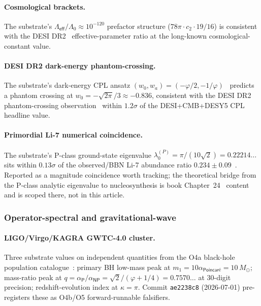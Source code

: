 \documentclass[11pt,a4paper]{amsart}
\theoremstyle{plain}
\theoremstyle{definition}
\begin{document}
\paragraph{Cosmological brackets.} The substrate's $\Lambda_{\textsf{eff}}/\Lambda_0 \approx 10^{-120}$ prefactor structure ($78\pi \cdot c_2 \cdot 19/16$) is consistent with the DESI DR2~\cite{desi-dr2-w0wa} effective-parameter ratio at the long-known cosmological-constant value.

\paragraph{DESI DR2 dark-energy phantom-crossing.} The substrate's dark-energy CPL ansatz $(w_0, w_a) = (-\varphi/2, -1/\varphi)$~\cite{cohen2026book} predicts a phantom crossing at $w_0 = -\sqrt{2\pi}/3 \approx -0.836$, consistent with the DESI DR2 phantom-crossing observation~\cite{desi-dr2-w0wa} within $1.2\sigma$ of the DESI+CMB+DESY5 CPL headline value.

\paragraph{Primordial Li-7 numerical coincidence.} The substrate's P-class ground-state eigenvalue $\lambda_0^{(P)} = \pi/(10\sqrt{2}) = 0.22214\ldots$ sits within $0.13\sigma$ of the observed/BBN Li-7 abundance ratio $0.234 \pm 0.09$~\cite{li7-deficit-2025}. Reported as a magnitude coincidence worth tracking; the theoretical bridge from the P-class analytic eigenvalue to nucleosynthesis is book Chapter~24~\cite{cohen2026book} content and is scoped there, not in this article.

\subsubsection*{Operator-spectral and gravitational-wave}

\paragraph{LIGO/Virgo/KAGRA GWTC-4.0 cluster.} Three substrate values on independent quantities from the O4a black-hole population catalogue~\cite{ligo-gwtc4-cat,ligo-gwtc4-pop}: primary BH low-mass peak at $m_1 = 10 \alpha_{\textsf{Poincar\'e}} = 10\, M_\odot$; mass-ratio peak at $q = \alpha_{\textsf{P}}/\alpha_{\textsf{NP}} = \sqrt{2}/(\varphi + 1/4) = 0.7570\ldots$ at 30-digit precision; redshift-evolution index at $\kappa = \pi$. Commit \texttt{ae2238c8} (2026-07-01) pre-registers these as O4b/O5 forward-runnable falsifiers.
\end{document}

